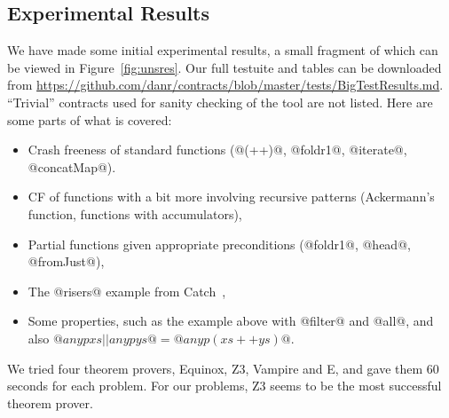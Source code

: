 \subsection{Experimental Results}



We have made some initial experimental results, a small fragment of which can be 
viewed in Figure~\ref{fig:unsres}. Our full testuite and tables can be downloaded from
\url{https://github.com/danr/contracts/blob/master/tests/BigTestResults.md}.
``Trivial'' contracts used for sanity checking of the tool are not listed. 
Here are some parts of what is covered:
\begin{itemize}
  \item Crash freeness of standard functions
    (@(++)@, @foldr1@, @iterate@, @concatMap@).

  \item CF of functions with a bit more involving recursive patterns
        (Ackermann's function, functions with accumulators),

%

  \item Partial functions given appropriate preconditions
        (@foldr1@, @head@, @fromJust@),

  \item The @risers@ example from Catch~\citep{Mitchell:2008:PBE:1411286.1411293},

  \item Some properties, such as the example above with @filter@ and @all@,
        and also $@any p xs || any p ys@ = @any p (xs ++ ys)@$.
\end{itemize}

We tried four theorem provers, Equinox, Z3, Vampire and E, and gave
them 60 seconds for each problem. For our problems, Z3 seems to be the most
successful theorem prover.

